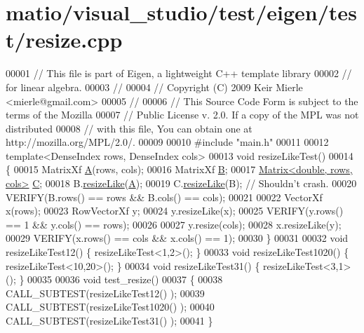 \hypertarget{matio_2visual__studio_2test_2eigen_2test_2resize_8cpp_source}{}\section{matio/visual\+\_\+studio/test/eigen/test/resize.cpp}
\label{matio_2visual__studio_2test_2eigen_2test_2resize_8cpp_source}

\begin{DoxyCode}
00001 \textcolor{comment}{// This file is part of Eigen, a lightweight C++ template library}
00002 \textcolor{comment}{// for linear algebra.}
00003 \textcolor{comment}{//}
00004 \textcolor{comment}{// Copyright (C) 2009 Keir Mierle <mierle@gmail.com>}
00005 \textcolor{comment}{//}
00006 \textcolor{comment}{// This Source Code Form is subject to the terms of the Mozilla}
00007 \textcolor{comment}{// Public License v. 2.0. If a copy of the MPL was not distributed}
00008 \textcolor{comment}{// with this file, You can obtain one at http://mozilla.org/MPL/2.0/.}
00009 
00010 \textcolor{preprocessor}{#include "main.h"}
00011 
00012 \textcolor{keyword}{template}<DenseIndex rows, DenseIndex cols>
00013 \textcolor{keywordtype}{void} resizeLikeTest()
00014 \{
00015   MatrixXf \hyperlink{group___core___module_class_eigen_1_1_matrix}{A}(rows, cols);
00016   MatrixXf \hyperlink{group___core___module_class_eigen_1_1_matrix}{B};
00017   \hyperlink{group___core___module_class_eigen_1_1_matrix}{Matrix<double, rows, cols>} \hyperlink{group___core___module}{C};
00018   B.\hyperlink{class_eigen_1_1_plain_object_base_acc7200947e6399bee847ff37c8270fc8}{resizeLike}(\hyperlink{group___core___module_class_eigen_1_1_matrix}{A});
00019   C.\hyperlink{class_eigen_1_1_plain_object_base_acc7200947e6399bee847ff37c8270fc8}{resizeLike}(B);  \textcolor{comment}{// Shouldn't crash.}
00020   VERIFY(B.rows() == rows && B.cols() == cols);
00021 
00022   VectorXf x(rows);
00023   RowVectorXf y;
00024   y.resizeLike(x);
00025   VERIFY(y.rows() == 1 && y.cols() == rows);
00026 
00027   y.resize(cols);
00028   x.resizeLike(y);
00029   VERIFY(x.rows() == cols && x.cols() == 1);
00030 \}
00031 
00032 \textcolor{keywordtype}{void} resizeLikeTest12() \{ resizeLikeTest<1,2>(); \}
00033 \textcolor{keywordtype}{void} resizeLikeTest1020() \{ resizeLikeTest<10,20>(); \}
00034 \textcolor{keywordtype}{void} resizeLikeTest31() \{ resizeLikeTest<3,1>(); \}
00035 
00036 \textcolor{keywordtype}{void} test\_resize()
00037 \{
00038   CALL\_SUBTEST(resizeLikeTest12() );
00039   CALL\_SUBTEST(resizeLikeTest1020() );
00040   CALL\_SUBTEST(resizeLikeTest31() );
00041 \}
\end{DoxyCode}
